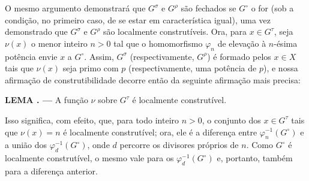 \documentclass[11pt,twoside,openany]{book}
\numberwithin{equation}{section}
\theoremstyle{plain}
\theoremstyle{definition}
\theoremstyle{remark}
\newcommand{\result}[2]{%
  \par\medskip\noindent\textbf{#1%
  \if\relax\detokenize{#2}\relax\else\space#2\fi. ---}\enspace
}
\begin{document}
O mesmo argumento demonstrará que $G^\sigma$ e $G^\rho$ são fechados se
$G^\circ$ o for (sob a condição, no primeiro caso, de se estar em
característica igual), uma vez demonstrado que $G^\sigma$ e $G^\rho$ são
localmente construtíveis. Ora, para $x\in G^\tau$, seja $\nu(x)$ o menor
inteiro $n>0$ tal que o homomorfismo $\varphi_n$ de elevação à $n$-ésima
potência envie $x$ a $G^\circ$. Assim, $G^\sigma$ (respectivamente,
$G^\rho$) é formado pelos $x\in X$ tais que $\nu(x)$ seja primo com $p$
(respectivamente, uma potência de $p$), e nossa afirmação de construtibilidade
decorre então da seguinte afirmação mais precisa:

\result{LEMA}{1.4} A função $\nu$ sobre $G^\tau$ é localmente construtível.

Isso significa, com efeito, que, para todo inteiro $n>0$, o conjunto dos
$x\in G^\tau$ tais que $\nu(x)=n$ é localmente construtível; ora, ele é a
diferença entre $\varphi_n^{-1}(G^\circ)$ e a união dos
$\varphi_d^{-1}(G^\circ)$, onde $d$ percorre os divisores próprios de $n$.
Como $G^\circ$ é localmente construtível, o mesmo vale para os
$\varphi_d^{-1}(G^\circ)$ e, portanto, também para a diferença anterior.
\end{document}
